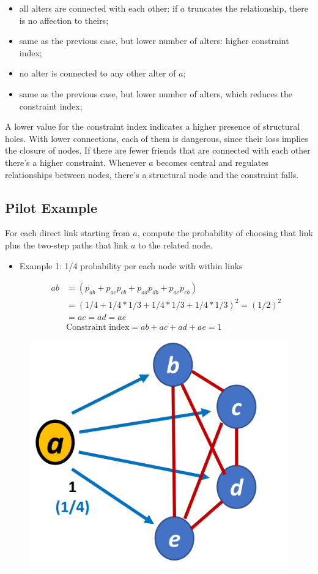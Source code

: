 \documentclass[
  notitlepage,
  onecolumn,
  openany]{book}
\providecommand{\tightlist}{%
  \setlength{\itemsep}{0pt}\setlength{\parskip}{0pt}}
\begin{document}
\begin{itemize}
\tightlist
\item
  all alters are connected with each other: if \(a\) truncates the relationship, there is no affection to theirs;
\item
  same as the previous case, but lower number of alters: higher constraint index;
\item
  no alter is connected to any other alter of \(a\);
\item
  same as the previous case, but lower number of alters, which reduces the constraint index;
\end{itemize}

A lower value for the constraint index indicates a higher presence of structural holes. With lower connections, each of them is dangerous, since their loss implies the closure of nodes. If there are fewer friends that are connected with each other there's a higher constraint. Whenever \(a\) becomes central and regulates relationships between nodes, there's a structural node and the constraint falls.

\hypertarget{pilot-example}{%
\subsection{Pilot Example}\label{pilot-example}}

For each direct link starting from \(a\), compute the probability of choosing that link plus the two-step paths that link \(a\) to the related node.

\begin{itemize}
\item
  Example 1: 1/4 probability per each node with within links

  \[
    \begin{aligned}
    ab &= (p_{ab}+p_{ac}p_{cb}+p_{ad}p_{db}+p_{ae}p_{eb})
    \\&= (1/4+1/4*1/3+1/4*1/3+1/4*1/3)^2 =(1/2)^2 \\
    & = ac = ad = ae\\
    &\text{Constraint index} = ab+ac+ad+ae = 1
    \end{aligned}
    \]
\end{itemize}

\begin{figure}[h!]

{\centering \includegraphics[width=0.4\linewidth]{images/08-Metrics for structural holes/Untitled} 

}

\end{figure}
\end{document}
